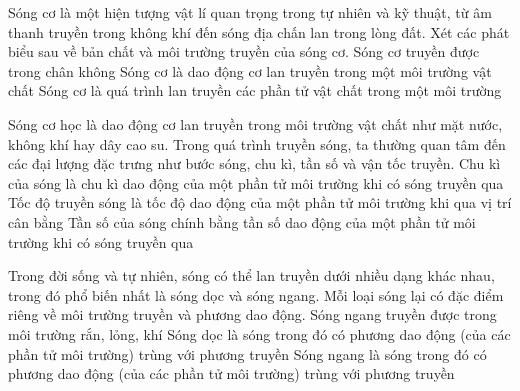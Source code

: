 \begin{ex}%
Sóng cơ là một hiện tượng vật lí quan trọng trong tự nhiên và kỹ thuật, từ âm thanh truyền trong không khí đến sóng địa chấn lan trong lòng đất. Xét các phát biểu sau về bản chất và môi trường truyền của sóng cơ.
{Sóng cơ truyền được trong chân không}
{Sóng cơ là dao động cơ lan truyền trong một môi trường vật chất}
{Sóng cơ là quá trình lan truyền các phần tử vật chất trong một môi trường}
\end{ex} 
\begin{ex}%
Sóng cơ học là dao động cơ lan truyền trong môi trường vật chất như mặt nước, không khí hay dây cao su. Trong quá trình truyền sóng, ta thường quan tâm đến các đại lượng đặc trưng như bước sóng, chu kì, tần số và vận tốc truyền.
{\True Chu kì của sóng là chu kì dao động của một phần tử môi trường khi có sóng truyền qua}
{Tốc độ truyền sóng là tốc độ dao động của một phần tử môi trường khi qua vị trí cân bằng}
{\True Tần số của sóng chính bằng tần số dao động của một phần tử môi trường khi có sóng truyền qua}
\end{ex} 
\begin{ex}%
Trong đời sống và tự nhiên, sóng có thể lan truyền dưới nhiều dạng khác nhau, trong đó phổ biến nhất là sóng dọc và sóng ngang. Mỗi loại sóng lại có đặc điểm riêng về môi trường truyền và phương dao động.
{Sóng ngang truyền được trong môi trường rắn, lỏng, khí}
{\True Sóng dọc là sóng trong đó có phương dao động (của các phần tử môi trường) trùng với phương truyền}
{Sóng ngang là sóng trong đó có phương dao động (của các phần tử môi trường) trùng với phương truyền} 
\end{ex} 

